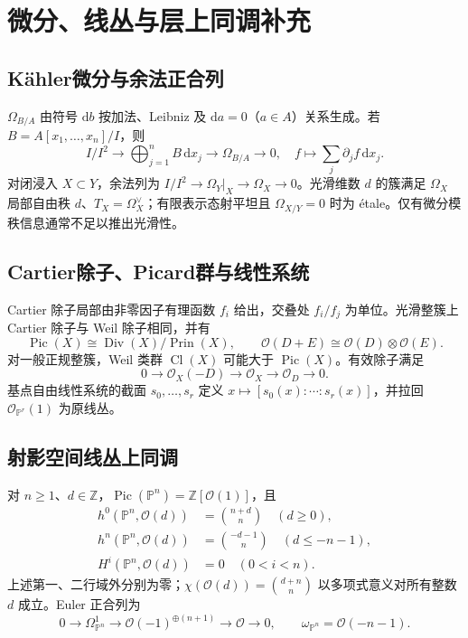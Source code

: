 \documentclass[../main.tex]{subfiles}
\begin{document}
\section{微分、线丛与层上同调补充}
\subsection{Kähler微分与余法正合列}
$\Omega_{B/A}$ 由符号 $\mathrm db$ 按加法、Leibniz 及 $\mathrm da=0$（$a\in A$）关系生成。若 $B=A[x_1,\ldots,x_n]/I$，则
\[
I/I^2\longrightarrow\bigoplus_{j=1}^nB\,\mathrm dx_j\longrightarrow\Omega_{B/A}\longrightarrow0,
\quad f\longmapsto\sum_j\partial_jf\,\mathrm dx_j.
\]
对闭浸入 $X\subset Y$，余法列为 $I/I^2\to\Omega_Y|_X\to\Omega_X\to0$。光滑维数 $d$ 的簇满足 $\Omega_X$ 局部自由秩 $d$、$T_X=\Omega_X^\vee$；有限表示态射平坦且 $\Omega_{X/Y}=0$ 时为 étale。仅有微分模秩信息通常不足以推出光滑性。
\subsection{Cartier除子、Picard群与线性系统}
Cartier 除子局部由非零因子有理函数 $f_i$ 给出，交叠处 $f_i/f_j$ 为单位。光滑整簇上 Cartier 除子与 Weil 除子相同，并有
\[
\operatorname{Pic}(X)\cong\operatorname{Div}(X)/\operatorname{Prin}(X),\qquad
\mathcal O(D+E)\cong\mathcal O(D)\otimes\mathcal O(E).
\]
对一般正规整簇，Weil 类群 $\operatorname{Cl}(X)$ 可能大于 $\operatorname{Pic}(X)$。有效除子满足
\[
0\to\mathcal O_X(-D)\to\mathcal O_X\to\mathcal O_D\to0.
\]
基点自由线性系统的截面 $s_0,\ldots,s_r$ 定义 $x\mapsto[s_0(x):\cdots:s_r(x)]$，并拉回 $\mathcal O_{\mathbb P^r}(1)$ 为原线丛。
\subsection{射影空间线丛上同调}
对 $n\ge1$、$d\in\mathbb Z$，$\operatorname{Pic}(\mathbb P^n)=\mathbb Z[\mathcal O(1)]$，且
\begin{align*}
h^0(\mathbb P^n,\mathcal O(d))&=\binom{n+d}n\quad(d\ge0),\\
h^n(\mathbb P^n,\mathcal O(d))&=\binom{-d-1}n\quad(d\le-n-1),\\
H^i(\mathbb P^n,\mathcal O(d))&=0\quad(0<i<n).
\end{align*}
上述第一、二行域外分别为零；$\chi(\mathcal O(d))=\binom{d+n}n$ 以多项式意义对所有整数 $d$ 成立。Euler 正合列为
\[
0\to\Omega_{\mathbb P^n}^1\to\mathcal O(-1)^{\oplus(n+1)}\to\mathcal O\to0,
\qquad\omega_{\mathbb P^n}=\mathcal O(-n-1).
\]
\end{document}
